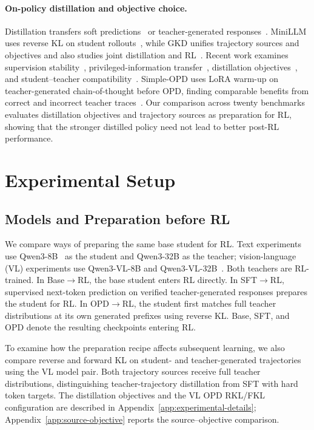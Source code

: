 \documentclass[]{jingdong}
\theoremstyle{plain}
\theoremstyle{definition}
\theoremstyle{remark}
\newcommand{\opdrl}{OPD$\rightarrow$RL}
\newcommand{\baserl}{Base$\rightarrow$RL}
\newcommand{\sftrl}{SFT$\rightarrow$RL}
\begin{document}
\paragraph{On-policy distillation and objective choice.}
Distillation transfers soft predictions~\citep{hinton2015distilling} or teacher-generated responses~\citep{kim2016sequence,hsieh2023distilling}. MiniLLM uses reverse KL on student rollouts~\citep{gu2024minillm}, while GKD unifies trajectory sources and objectives and also studies joint distillation and RL~\citep{agarwal2024gkd}. Recent work examines supervision stability~\citep{fu2026revisiting}, privileged-information transfer~\citep{yu2026dopd}, distillation objectives~\citep{wu2025rethinkingkl,jin2026entropy}, and student--teacher compatibility~\citep{li2026rethinkingopd}. Simple-OPD uses LoRA warm-up on teacher-generated chain-of-thought before OPD, finding comparable benefits from correct and incorrect teacher traces~\citep{liu2026simpleopd}. Our comparison across twenty benchmarks evaluates distillation objectives and trajectory sources as preparation for RL, showing that the stronger distilled policy need not lead to better post-RL performance.

\section{Experimental Setup}
\label{sec:framework}

\subsection{Models and Preparation before RL}
We compare ways of preparing the same base student for RL. Text experiments use Qwen3-8B~\citep{yang2025qwen3} as the student and Qwen3-32B as the teacher; vision-language (VL) experiments use Qwen3-VL-8B and Qwen3-VL-32B~\citep{bai2025qwen3vl}. Both teachers are RL-trained. In \baserl{}, the base student enters RL directly. In \sftrl{}, supervised next-token prediction on verified teacher-generated responses prepares the student for RL. In \opdrl{}, the student first matches full teacher distributions at its own generated prefixes using reverse KL. Base, SFT, and OPD denote the resulting checkpoints entering RL.

To examine how the preparation recipe affects subsequent learning, we also compare reverse and forward KL on student- and teacher-generated trajectories using the VL model pair. Both trajectory sources receive full teacher distributions, distinguishing teacher-trajectory distillation from SFT with hard token targets. The distillation objectives and the VL OPD RKL/FKL configuration are described in Appendix~\ref{app:experimental-details}; Appendix~\ref{app:source-objective} reports the source--objective comparison.
\end{document}
